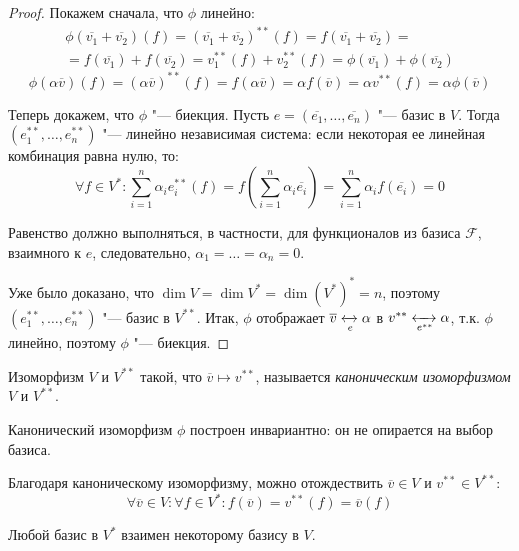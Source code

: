 \begin{proof}
	Покажем сначала, что $\phi$ линейно:
	\begin{multline*}
		\phi(\overline{v_1} + \overline{v_2})(f) = (\overline{v_1} + \overline{v_2})^{**}(f) = f(\overline{v_1} + \overline{v_2}) =\\ = f(\overline{v_1}) + f(\overline{v_2}) = v_1^{**}(f) + v_2^{**}(f) = \phi(\overline{v_1}) + \phi(\overline{v_2})
	\end{multline*}
	\[\phi(\alpha \overline{v})(f) = (\alpha \overline{v})^{**}(f) = f(\alpha \overline{v}) = \alpha f(\overline{v}) = \alpha v^{**}(f) = \alpha \phi(\overline{v})\]
	
	Теперь докажем, что $\phi$ "--- биекция. Пусть $e = (\overline{e_1}, \dots, \overline{e_n})$ "--- базис в $V$. Тогда $(e_1^{**}, \dots, e_n^{**})$ "--- линейно независимая система: если некоторая ее линейная комбинация равна нулю, то:
	\[\forall f \in V^*: \sum_{i = 1}^{n}\alpha_ie_i^{**}(f) = f\left(\sum_{i = 1}^n\alpha_i\overline{e_i}\right) = \sum_{i = 1}^n\alpha_if(\overline{e_i}) = 0\]
	
	Равенство должно выполняться, в частности, для функционалов из базиса $\mathcal{F}$, взаимного к $e$, следовательно, $\alpha_1 = \dots = \alpha_n = 0$.
	
	Уже было доказано, что $\dim{V} = \dim{V^*} = \dim{(V^*)^*} = n$, поэтому $(e_1^{**}, \dots, e_n^{**})$ "--- базис в $V^{**}$. Итак, $\phi$ отображает $\overline{v} \xleftrightarrow[e]{} \alpha$ в $v^{**} \xleftrightarrow[e^{**}]{} \alpha$, т.\:к. $\phi$ линейно, поэтому $\phi$ "--- биекция.
\end{proof}

\begin{definition}
	Изоморфизм $V$ и $V^{**}$ такой, что $\overline{v} \mapsto v^{**}$, называется \textit{каноническим изоморфизмом} $V$ и $V^{**}$.
\end{definition}

\begin{note}
	Канонический изоморфизм $\phi$ построен инвариантно: он не опирается на выбор базиса.
\end{note}

\begin{note}
	Благодаря каноническому изоморфизму, можно отождествить $\overline{v} \in V$ и $v^{**} \in V^{**}$:
	\[\forall \overline{v} \in V: \forall f \in V^*: f(\overline{v}) = v^{**}(f) = \overline{v}(f)\]
\end{note}

\begin{proposition}
	Любой базис в $V^*$ взаимен некоторому базису в $V$.
\end{proposition}

